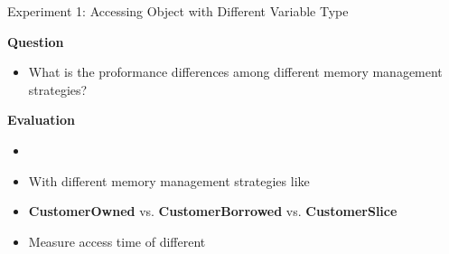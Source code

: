 \documentclass[9pt]{beamer}
\begin{document}
\begin{frame}[fragile]{Experiment 1: Accessing Object with Different Variable Type}

    \textbf{Question}
    \begin{itemize}
        \item What is the proformance differences among different memory management strategies?
    \end{itemize}

    \vspace{0.5cm}

    \textbf{Evaluation}
    \begin{itemize}
        \item {}
        \item With different memory management strategies like 
        \item \textbf{CustomerOwned} vs. \textbf{CustomerBorrowed} vs. \textbf{CustomerSlice}
        \item Measure access time of different 
    \end{itemize}

\end{frame}

% 
% 

\end{document}
